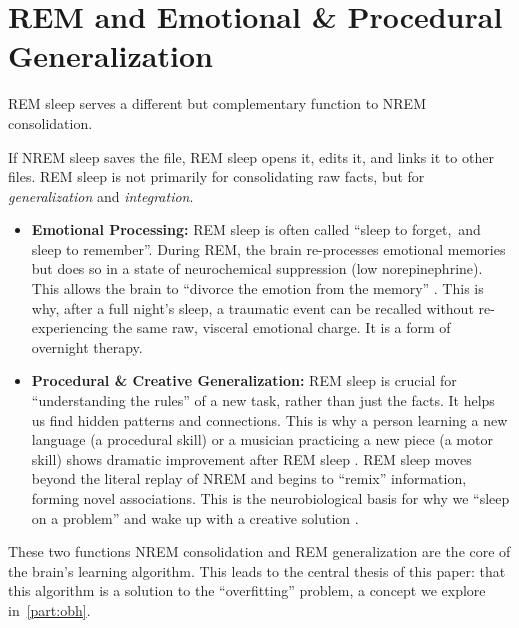 \section{REM and Emotional \& Procedural Generalization}\label{sec:rem_generalization}

REM sleep serves a different but complementary function to NREM consolidation.

If NREM sleep saves the file, REM sleep opens it, edits it, and links it to other files. REM sleep is not primarily for consolidating raw facts, but for \textit{generalization} and \textit{integration}.

\begin{itemize}
    \item \textbf{Emotional Processing:} REM sleep is often called ``sleep to forget,~and sleep to remember''. During REM, the brain re-processes emotional memories but does so in a state of neurochemical suppression (low norepinephrine). This allows the brain to ``divorce the emotion from the memory'' \citep{yoo2007}. This is why, after a full night's sleep, a traumatic event can be recalled without re-experiencing the same raw, visceral emotional charge. It is a form of overnight therapy.
    
    \item \textbf{Procedural \& Creative Generalization:} REM sleep is crucial for ``understanding the rules'' of a new task, rather than just the facts. It helps us find hidden patterns and connections. This is why a person learning a new language (a procedural skill) or a musician practicing a new piece (a motor skill) shows dramatic improvement after REM sleep \citep{stickgold2013}. REM sleep moves beyond the literal replay of NREM and begins to ``remix'' information, forming novel associations. This is the neurobiological basis for why we ``sleep on a problem'' and wake up with a creative solution \citep{cai2009}.
\end{itemize}

These two functions \- NREM consolidation and REM generalization \- are the core of the brain's learning algorithm. This leads to the central thesis of this paper: that this algorithm is a solution to the ``overfitting'' problem, a concept we explore in~\ref{part:obh}.
